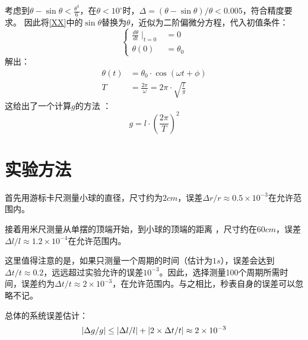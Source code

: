 \documentclass[a4paper]{ltxdoc}
\begin{document}
\begin{multicols}{2}
  考虑到$\theta - \sin \theta<\frac {\theta^3} 6$，在$\theta < 10 ^{\circ}$时，$\Delta = (\theta - \sin\theta)/\theta < 0.005$，符合精度要求。
  因此将\eqref{XX}中的$\sin\theta$替换为$\theta$，近似为二阶偏微分方程，代入初值条件：
  $$\left\{
    \begin{aligned}
      \frac {d\theta} {dt} \mid _{t = 0} & = 0        \\
      \theta (0)                         & = \theta_0
    \end{aligned}
    \right.$$
  解出：
  \begin{equation}
    \begin{aligned}
      \theta(t) & =\theta_0\cdot\cos (\omega t+\phi)                  \\
      T         & = \frac {2\pi}{\omega} = 2\pi \cdot\sqrt{\frac l g}
    \end{aligned}
  \end{equation}
  这给出了一个计算$g$的方法
  ：
  \begin{equation}
    g = l \cdot (\frac {2\pi} T)^2 \label{XY}
  \end{equation}
  \section{实验方法}
  首先用游标卡尺测量小球的直径，尺寸约为$2cm$，误差$\Delta r /r\approx 0.5 \times 10^{-3}$在允许范围内。

  接着用米尺测量从单摆的顶端开始，到小球的顶端的距离
  ，尺寸约在$60cm$，误差$\Delta l /l \approx 1.2 \times 10^{-4}$在允许范围内。

  这里值得注意的是，如果只测量一个周期的时间（估计为$1s$），误差会达到$\Delta t/t\approx 0.2$，远远超过实验允许的误差$10^{-3}$。因此，选择测量100个周期所需时间，误差约为$\Delta t/t\approx 2\times 10^{-3}$，在允许范围内。与之相比，秒表自身的误差可以忽略不记。

  总体的系统误差估计：
  $$\lvert\Delta g/g\rvert \leq \lvert\Delta l/l\rvert + \lvert2\times \Delta t/t\rvert\\
    \approx 2\times 10^{-3}$$

\end{multicols}
\end{document}
